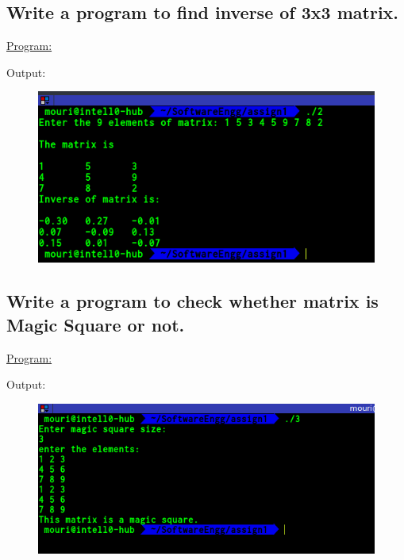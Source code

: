 \documentclass[a4paper,11pt]{article}
\begin{document}
\bigskip

\subsection{Write a program to find inverse of 3x3 matrix.}
\underline{Program:}

Output:
\begin{figure}[H]
\centering
\includegraphics[width=350pt,height=\textheight,keepaspectratio]{./pics/C/2.png}
\end{figure}

\bigskip

\subsection{Write a program to check whether matrix is Magic Square or not.}
\underline{Program:}

Output:
\begin{figure}[H]
\centering
\includegraphics[width=350pt,height=\textheight,keepaspectratio]{./pics/C/3.png}
\end{figure}
\bigskip
\end{document}
